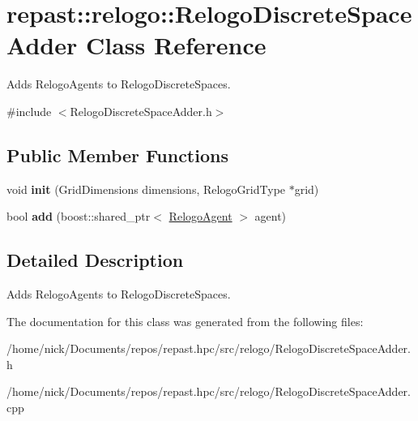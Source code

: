 \hypertarget{classrepast_1_1relogo_1_1_relogo_discrete_space_adder}{\section{repast\-:\-:relogo\-:\-:Relogo\-Discrete\-Space\-Adder Class Reference}
\label{classrepast_1_1relogo_1_1_relogo_discrete_space_adder}
}


Adds Relogo\-Agents to Relogo\-Discrete\-Spaces.  




{\ttfamily \#include $<$Relogo\-Discrete\-Space\-Adder.\-h$>$}

\subsection*{Public Member Functions}
\begin{DoxyCompactItemize}
\item 
\hypertarget{classrepast_1_1relogo_1_1_relogo_discrete_space_adder_ac8700b679f36c3a2d6fd337567763bd2}{void {\bfseries init} (Grid\-Dimensions dimensions, Relogo\-Grid\-Type $\ast$grid)}\label{classrepast_1_1relogo_1_1_relogo_discrete_space_adder_ac8700b679f36c3a2d6fd337567763bd2}

\item 
\hypertarget{classrepast_1_1relogo_1_1_relogo_discrete_space_adder_ab37d7d2fcbe6543ccd55526c4342ec58}{bool {\bfseries add} (boost\-::shared\-\_\-ptr$<$ \hyperlink{classrepast_1_1relogo_1_1_relogo_agent}{Relogo\-Agent} $>$ agent)}\label{classrepast_1_1relogo_1_1_relogo_discrete_space_adder_ab37d7d2fcbe6543ccd55526c4342ec58}

\end{DoxyCompactItemize}


\subsection{Detailed Description}
Adds Relogo\-Agents to Relogo\-Discrete\-Spaces. 

The documentation for this class was generated from the following files\-:\begin{DoxyCompactItemize}
\item 
/home/nick/\-Documents/repos/repast.\-hpc/src/relogo/Relogo\-Discrete\-Space\-Adder.\-h\item 
/home/nick/\-Documents/repos/repast.\-hpc/src/relogo/Relogo\-Discrete\-Space\-Adder.\-cpp\end{DoxyCompactItemize}
